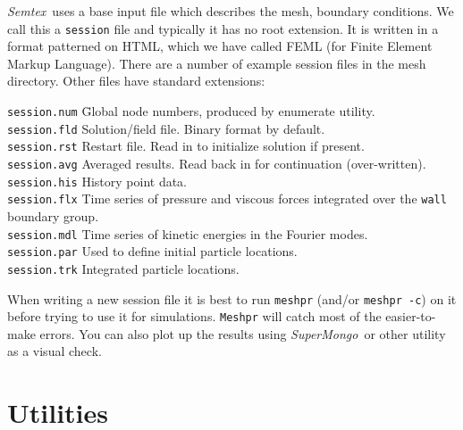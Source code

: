 \documentclass[11pt,a4paper]{report}
\newcommand{\Semtex}{\emph{Semtex}}
\newcommand{\SM}{\emph{SuperMongo}}
\begin{document}
\Semtex\ uses a base input file which describes the mesh, boundary
conditions.  We call this a \verb+session+ file and typically it has
no root extension.  It is written in a format patterned on HTML, which
we have called FEML (for Finite Element Markup Language).  There are a
number of example session files in the mesh directory.  Other files
have standard extensions:
\begin{tabbing}
\texttt{session.num}  \=
        Global node numbers, produced by enumerate utility.\\
\texttt{session.fld}  \>
        Solution/field file.  Binary format by default.\\
\texttt{session.rst}  \>
        Restart file. Read in to initialize solution if present.\\
\texttt{session.avg} \> Averaged results. Read back in for
        continuation (over-written).\\
\texttt{session.his} \> History point data.\\
\texttt{session.flx} \> Time series of pressure and viscous forces
        integrated over the \texttt{wall} boundary group.\\
\texttt{session.mdl} \> Time series of kinetic energies in the Fourier modes.\\
\texttt{session.par} \> Used to define initial particle locations.\\
\texttt{session.trk} \> Integrated particle locations.\\
\end{tabbing}
When writing a new session file it is best to run \texttt{meshpr}
(and/or \texttt{meshpr -c}) on it before trying to use it for
simulations.  \texttt{Meshpr} will catch most of the easier-to-make
errors.  You can also plot up the results using \SM\ or other
utility as a visual check.

\section{Utilities}
\end{document}
